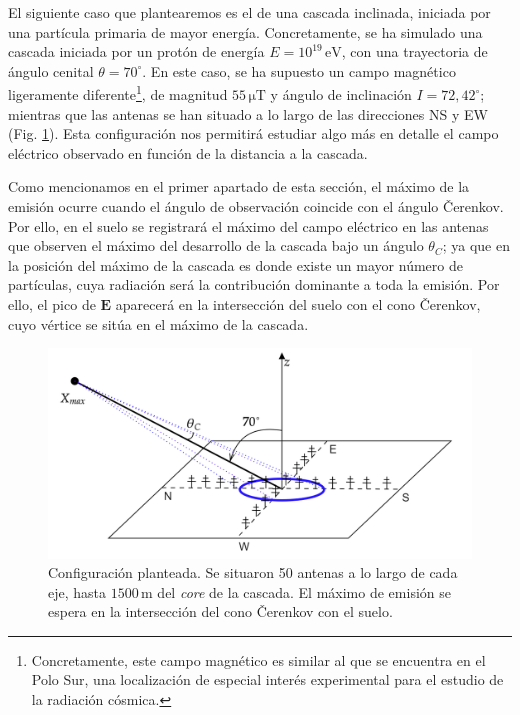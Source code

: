 \documentclass[12 pt, a4paper]{article} %
\numberwithin{equation}{section}
\numberwithin{figure}{section}
\numberwithin{table}{section}
\newcommand{\vect}[1]{\boldsymbol{\mathbf{#1}}}
\begin{document}
El siguiente caso que plantearemos es el de una cascada inclinada, iniciada por una partícula primaria de mayor energía. Concretamente, se ha simulado una cascada iniciada por un protón de energía $E=10^{19}\,\mathrm{eV}$, con una trayectoria de ángulo cenital $\theta=70^{\circ}$. En este caso, se ha supuesto un campo magnético ligeramente diferente\footnote{ Concretamente, este campo magnético es similar al que se encuentra en el Polo Sur, una localización de especial interés experimental para el estudio de la radiación cósmica.}, de magnitud $55\,\mathrm{\mu T}$ y ángulo de inclinación $I = 72,42^\circ$; mientras que las antenas se han situado a lo largo de las direcciones NS y EW (Fig. \ref{ANITApaper_showscheme}). Esta configuración nos permitirá estudiar algo más en detalle el campo eléctrico observado en función de la distancia a la cascada.

Como mencionamos en el primer apartado de esta sección, el máximo de la emisión ocurre cuando el ángulo de observación coincide con el ángulo \v{C}erenkov. Por ello, en el suelo se registrará el máximo del campo eléctrico en las antenas que observen el máximo del desarrollo de la cascada bajo un ángulo $\theta_C$; ya que en la posición del máximo de la cascada es donde existe un mayor número de partículas, cuya radiación será la contribución dominante a toda la emisión. Por ello, el pico de $\vect{E}$ aparecerá en la intersección del suelo con el cono \v{C}erenkov, cuyo vértice se sitúa en el máximo de la cascada. 
\begin{figure}[H]
	\centering
	\includegraphics[width=.6\linewidth]{figures/radio/ANITApaper_showscheme}
	\caption{Configuración planteada. Se situaron 50 antenas a lo largo de cada eje, hasta $1500\,\mathrm{m}$ del \textit{core} de la cascada. El máximo de emisión se espera en la intersección del cono \v{C}erenkov con el suelo.}
	\label{ANITApaper_showscheme}
\end{figure}
\end{document}

